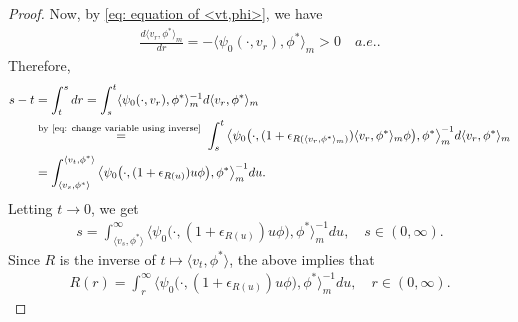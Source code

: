 \documentclass[12pt,a4paper]{amsart}
\theoremstyle{definition}
\numberwithin{equation}{section}
\begin{document}
\begin{proof}
	Now, by \eqref{eq: equation of <vt,phi>}, we have
  \begin{align}
    \frac{d \langle v_r, \phi^* \rangle_m}{dr}
    = - \langle \psi_0(\cdot ,v_r) ,\phi^*\rangle_m
    > 0
    \quad a.e..
  \end{align}
	Therefore,
  \begin{align}
    s-t
    & = \int_t^s dr
      = \int_s^t \langle \psi_0(\cdot ,v_r), \phi^*\rangle _m^{-1} d\langle v_r ,\phi^* \rangle_m
    \\ & \overset{\text{by \eqref{eq: change variable using inverse} }}{=} \int_s^t \big\langle \psi_0\big( \cdot ,(1+ \epsilon_{R(\langle v_r,\phi^* \rangle_m)})\langle v_r,\phi^*\rangle_m \phi \big), \phi^* \big\rangle_m^{-1} d\langle v_r ,\phi^* \rangle_m
    \\ & = \int_{\langle v_s,\phi^*\rangle}^{\langle v_t, \phi^* \rangle} \big\langle \psi_0 \big( \cdot ,( 1 + \epsilon_{R(u)} ) u \phi \big), \phi^* \big\rangle_m^{-1} du.
  \end{align}
	Letting $t\to 0$, we get
  \begin{align}
    s
    = \int_{\langle v_s,\phi^*\rangle}^\infty \big\langle \psi_0 \big(\cdot ,( 1 + \epsilon_{R(u)} ) u \phi \big), \phi^* \big\rangle_m^{-1} du,
    \quad s\in (0,\infty).
\end{align}
Since $R$ is the inverse of $t\mapsto \langle v_t,\phi^*\rangle$, the above implies that
\begin{align}\label{eq: integral equation for R}
	R(r)
	= \int_r^\infty \big\langle \psi_0 \big(\cdot ,( 1 + \epsilon_{R(u)} ) u \phi \big), \phi^* \big\rangle_m^{-1} du,
	\quad r\in (0,\infty).
\end{align}
	

\end{proof}
\end{document}
